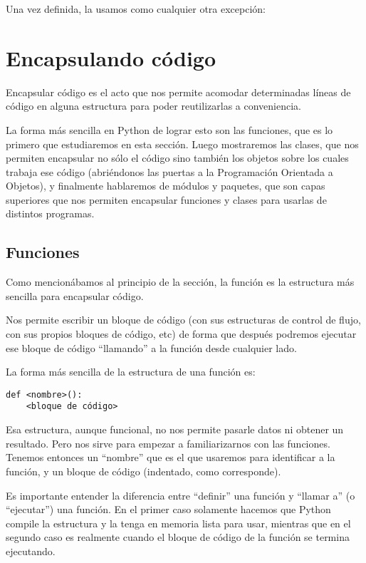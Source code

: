 Una vez definida, la usamos como cualquier otra excepción:



\section{Encapsulando código}

Encapsular código es el acto que nos permite acomodar determinadas líneas de código en alguna estructura para poder reutilizarlas a conveniencia.

La forma más sencilla en Python de lograr esto son las funciones, que es lo primero que estudiaremos en esta sección. Luego mostraremos las clases, que nos permiten encapsular no sólo el código sino también los objetos sobre los cuales trabaja ese código (abriéndonos las puertas a la Programación Orientada a Objetos), y finalmente hablaremos de módulos y paquetes, que son capas superiores que nos permiten encapsular funciones y clases para usarlas de distintos programas.


\subsection{Funciones}\label{sub:funciones}

Como mencionábamos al principio de la sección, la función es la estructura más sencilla para encapsular código. 

Nos permite escribir un bloque de código (con sus estructuras de control de flujo, con sus propios bloques de código, etc) de forma que después podremos ejecutar ese bloque de código ``llamando'' a la función desde cualquier lado.

La forma más sencilla de la estructura de una función es:

\begin{verbatim}
def <nombre>():
    <bloque de código>
\end{verbatim}

Esa estructura, aunque funcional, no nos permite pasarle datos ni obtener un resultado. Pero nos sirve para empezar a familiarizarnos con las funciones. Tenemos entonces un ``nombre'' que es el que usaremos para identificar a la función, y un bloque de código (indentado, como corresponde).

Es importante entender la diferencia entre ``definir'' una función y ``llamar a'' (o ``ejecutar'') una función. En el primer caso solamente hacemos que Python compile la estructura y la tenga en memoria lista para usar, mientras que en el segundo caso es realmente cuando el bloque de código de la función se termina ejecutando.

